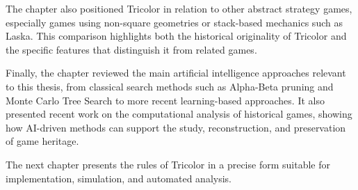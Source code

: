 The chapter also positioned Tricolor in relation to other abstract strategy games, especially games using non-square geometries or stack-based mechanics such as Laska. This comparison highlights both the historical originality of Tricolor and the specific features that distinguish it from related games.

Finally, the chapter reviewed the main artificial intelligence approaches relevant to this thesis, from classical search methods such as Alpha-Beta pruning and Monte Carlo Tree Search to more recent learning-based approaches. It also presented recent work on the computational analysis of historical games, showing how AI-driven methods can support the study, reconstruction, and preservation of game heritage.

The next chapter presents the rules of Tricolor in a precise form suitable for implementation, simulation, and automated analysis.


